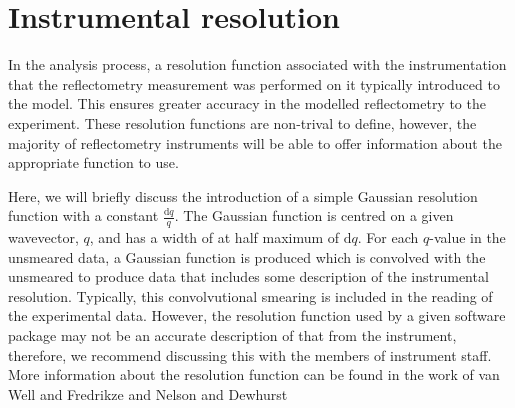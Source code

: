 \documentclass[
 reprint,
 superscriptaddress,
 amsmath,amssymb,
 aps,
]{revtex4-1}
\begin{document}
\section{Instrumental resolution}
In the analysis process, a resolution function associated with the instrumentation that the reflectometry measurement was performed on it typically introduced to the model. 
This ensures greater accuracy in the modelled reflectometry to the experiment.
These resolution functions are non-trival to define, however, the majority of reflectometry instruments will be able to offer information about the appropriate function to use.

Here, we will briefly discuss the introduction of a simple Gaussian resolution function with a constant $\frac{\text{d}q}{q}$.
The Gaussian function is centred on a given wavevector, $q$, and has a width of at half maximum of $\text{d}q$.
For each $q$-value in the unsmeared data, a Gaussian function is produced which is convolved with the unsmeared to produce data that includes some description of the instrumental resolution.
Typically, this convolvutional smearing is included in the reading of the experimental data.
However, the resolution function used by a given software package may not be an accurate description of that from the instrument, therefore, we recommend discussing this with the members of instrument staff.
More information about the resolution function can be found in the work of van Well and Fredrikze \cite{vanwell_resolution_2005} and Nelson and Dewhurst \cite{nelson_towards_2013,nelson_towards_2014}
\end{document}
